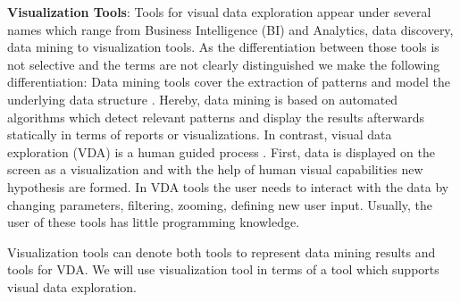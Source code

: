 \textbf{Visualization Tools}\label{tools}:
Tools for visual data exploration appear under several names which range from Business Intelligence (BI) and Analytics, data discovery, data mining to visualization tools. As the differentiation between those tools is not selective and the terms are not clearly distinguished we make the following differentiation:
Data mining tools cover the extraction of patterns and model the underlying data structure  \cite{FerreiradeOliveira2003}. Hereby, data mining is based on automated algorithms which detect relevant patterns and display the results afterwards statically in terms of reports or visualizations. In contrast, visual data exploration (VDA) is a human guided process  \cite{FerreiradeOliveira2003}. First, data is displayed on the screen as a visualization and with the help of human visual capabilities new hypothesis are formed. In VDA tools the user needs to interact with the data by changing parameters, filtering, zooming, defining new user input. Usually, the user of these tools has little programming knowledge.
\iffalse
Data visualization is a more general term for generating a graphical representation out of data and is used in BI, Analytics, data discovery and in visual analytics.
\fi
Visualization tools can denote both tools to represent data mining results and tools for VDA. We will use visualization tool in terms of a tool which supports visual data exploration. 


\iffalse
Data Mining tools allow automatic decision-making by algorithms which are applied to the data and extract patterns in an automatic way  \cite{Goebel1999}. Exploratory data analysis (EDA) tools are used to mine data with support of human input. We will use the definition of EDA tools for  visualization tools in this work. As a pwc-survey showed eventhough automatic ways for decision support exist data analysis still relies on human judgement and thus  \cite{PwC2016}, visualization tools are used to support the business user in the data discovery process. The main goal of visualization tools is the user support in gaining insights into the data. 
Visualization tools display hundreds of items on the screen and offer interaction techniques such as zooming and filtering  \cite{Shneiderman2008}.
\fi

